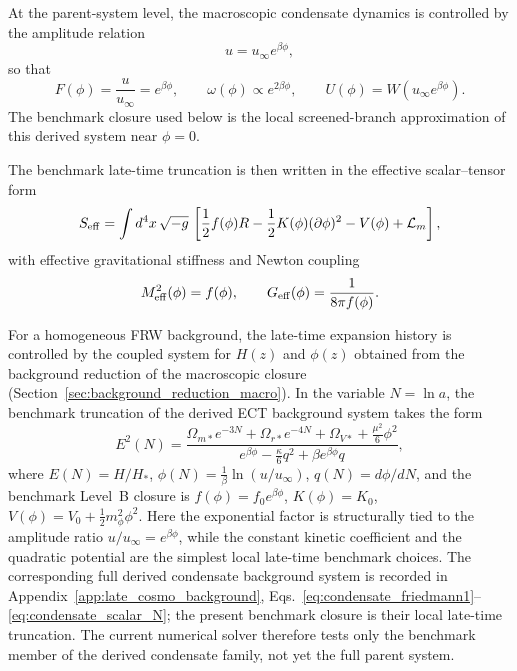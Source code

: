 \documentclass[11pt,a4paper]{article}
\numberwithin{equation}{section}
\begin{document}
At the parent-system level, the macroscopic condensate dynamics is
controlled by the amplitude relation
\[
u=u_\infty e^{\beta\phi},
\]
so that
\[
F(\phi)=\frac{u}{u_\infty}=e^{\beta\phi},
\qquad
\omega(\phi)\propto e^{2\beta\phi},
\qquad
U(\phi)=W(u_\infty e^{\beta\phi}).
\]
The benchmark closure used below is the local screened-branch
approximation of this derived system near $\phi=0$.

The benchmark late-time truncation is then written in the effective
scalar--tensor form
\begin{equation}
S_{\rm eff}
=
\int d^4x\,\sqrt{-g}\,
\left[
\frac12 f(\phi)R
-\frac12 K(\phi)(\partial\phi)^2
-V(\phi)
+\mathcal L_m
\right],
\label{eq:late_cosmo_action_main}
\end{equation}
with effective gravitational stiffness and Newton coupling
\[
M_{\rm eff}^2(\phi)=f(\phi),
\qquad
G_{\rm eff}(\phi)=\frac{1}{8\pi f(\phi)}.
\]

For a homogeneous FRW background, the late-time expansion history
is controlled by the coupled system for $H(z)$ and $\phi(z)$ obtained
from the background reduction of the macroscopic closure
(Section~\ref{sec:background_reduction_macro}).
In the variable $N=\ln a$, the benchmark truncation of the derived ECT
background system takes the form
\begin{equation}
E^2(N)
=
\frac{
\Omega_{m*}e^{-3N}
+\Omega_{r*}e^{-4N}
+\Omega_{V*}
+\frac{\mu^2}{6}\phi^2
}{
e^{\beta \phi}
-\frac{\kappa}{6}q^2
+\beta e^{\beta \phi}q
},
\label{eq:ect_late_friedmann_main}
\end{equation}
where $E(N)=H/H_*$, $\phi(N)=\frac{1}{\beta}\ln(u/u_\infty)$,
$q(N)=d\phi/dN$, and the benchmark Level~B closure is
$f(\phi)=f_0 e^{\beta\phi}$,
$K(\phi)=K_0$, $V(\phi)=V_0+\frac12 m_\phi^2\phi^2$.
Here the exponential factor is structurally tied to the amplitude ratio
$u/u_\infty=e^{\beta\phi}$, while the constant kinetic coefficient and the
quadratic potential are the simplest local late-time benchmark choices.
The corresponding full derived condensate background system is recorded
in Appendix~\ref{app:late_cosmo_background},
Eqs.~\eqref{eq:condensate_friedmann1}--\eqref{eq:condensate_scalar_N};
the present benchmark closure is their local late-time truncation.
The current numerical solver therefore tests only the benchmark member
of the derived condensate family, not yet the full parent system.
\end{document}
